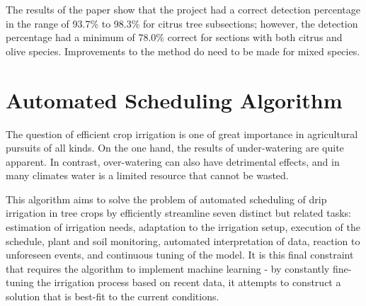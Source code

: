 \documentclass[]{article}
\begin{document}
The results of the paper show that the project had a correct detection percentage in the range of 93.7\% to 98.3\% for citrus tree subsections; however, the detection percentage had a minimum of 78.0\% correct for sections with both citrus and olive species.  Improvements to the method do need to be made for mixed species. 



\section{Automated Scheduling Algorithm}
The question of efficient crop irrigation is one of great importance in agricultural pursuits of all kinds. On the one hand, the results of under-watering are quite apparent. In contrast, over-watering can also have detrimental effects, and in many climates water is a limited resource that cannot be wasted.

This algorithm aims to solve the problem of automated scheduling of drip irrigation in tree crops by efficiently streamline seven distinct but related tasks: estimation of irrigation needs, adaptation to the irrigation setup, execution of the schedule, plant and soil monitoring, automated interpretation of data, reaction to unforeseen events, and continuous tuning of the model\cite[Casadesus 2012]{casadesus2012drip}. It is this final constraint that requires the algorithm to implement machine learning - by constantly fine-tuning the irrigation process based on recent data, it attempts to construct a solution that is best-fit to the current conditions.
\cite[Casadesus 2012]{casadesus2012drip}


\end{document}
